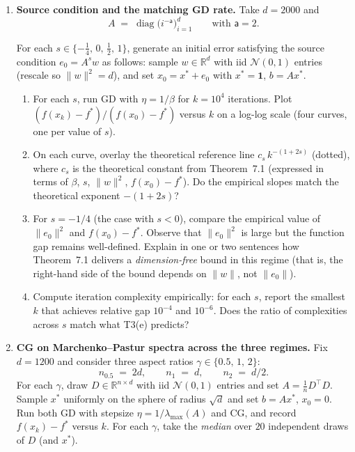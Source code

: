 \documentclass[11pt]{article}
\newcommand{\R}{\mathbb{R}}
\newcommand{\bstar}{f^\ast}
\newcommand{\xstar}{x^\ast}
\newcommand{\norm}[1]{\lVert #1\rVert}
\begin{document}
\begin{enumerate}[label=\textbf{E\arabic*.}, leftmargin=0pt, itemindent=2.5em]
\item \textbf{Source condition and the matching GD rate.}
Take $d=2000$ and
\[
A \;=\; \operatorname{diag}\bigl(i^{-\mathsf{a}}\bigr)_{i=1}^d\qquad\text{with }\mathsf{a}=2.
\]

For each $s\in\{-\tfrac{1}{4},\,0,\,\tfrac{1}{2},\,1\}$, generate an initial error satisfying the source condition $e_0=A^s w$ as follows: sample $w\in\R^d$ with iid $\mathcal{N}(0,1)$ entries (rescale so $\norm{w}^2=d$), and set $x_0=\xstar+e_0$ with $\xstar=\mathbf{1}$, $b=A\xstar$.

\begin{enumerate}[label=(\alph*)]
\item For each $s$, run GD with $\eta=1/\beta$ for $k=10^4$ iterations. Plot $(f(x_k)-\bstar)/(f(x_0)-\bstar)$ versus $k$ on a log-log scale (four curves, one per value of $s$).

\item On each curve, overlay the theoretical reference line $c_s\,k^{-(1+2s)}$ (dotted), where $c_s$ is the theoretical constant from Theorem~7.1 (expressed in terms of $\beta$, $s$, $\norm{w}^2$, $f(x_0)-\bstar$). Do the empirical slopes match the theoretical exponent $-(1+2s)$?

\item For $s=-1/4$ (the case with $s<0$), compare the empirical value of $\norm{e_0}^2$ and $f(x_0)-\bstar$. Observe that $\norm{e_0}^2$ is large but the function gap remains well-defined. Explain in one or two sentences how Theorem~7.1 delivers a \emph{dimension-free} bound in this regime (that is, the right-hand side of the bound depends on $\norm{w}$, not $\norm{e_0}$).

\item Compute iteration complexity empirically: for each $s$, report the smallest $k$ that achieves relative gap $10^{-4}$ and $10^{-6}$. Does the ratio of complexities across $s$ match what T3(e) predicts?
\end{enumerate}

\item \textbf{CG on Marchenko--Pastur spectra across the three regimes.}
Fix $d=1200$ and consider three aspect ratios $\gamma\in\{0.5,\,1,\,2\}$:
\[
n_{0.5} \;=\; 2d,\qquad n_{1} \;=\; d,\qquad n_{2} \;=\; d/2.
\]
For each $\gamma$, draw $D\in\R^{n\times d}$ with iid $\mathcal{N}(0,1)$ entries and set $A=\tfrac{1}{n}D^\top D$. Sample $\xstar$ uniformly on the sphere of radius $\sqrt{d}$ and set $b=A\xstar$, $x_0=0$. Run both GD with stepsize $\eta=1/\lambda_{\max}(A)$ and CG, and record $f(x_k)-\bstar$ versus $k$. For each $\gamma$, take the \emph{median} over $20$ independent draws of $D$ (and $\xstar$).


\end{enumerate}
\end{document}
